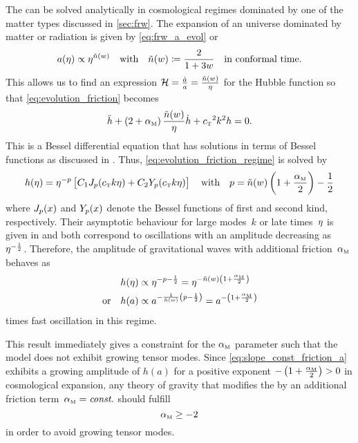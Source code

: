 \documentclass[12pt,parskip=half]{scrreprt}
\begin{document}
The  can be solved analytically in cosmological regimes dominated by one of the matter types discussed in \autoref{sec:frw}. The expansion of an \FLRW universe dominated by matter or radiation is given by \eqref{eq:frw_a_evol} or
\begin{equation}
	a(\eta) \propto \eta^{\tilde{n}(w)} \quad \text{with} \quad \tilde{n}(w) \coloneqq \frac{2}{1+3w} \quad \text{in conformal time.}
\end{equation}
This allows us to find an expression \(\mathcal{H} = \frac{\dot{a}}{a} = \frac{\tilde{n}(w)}{\eta}\) for the Hubble function so that \eqref{eq:evolution_friction} becomes
\begin{equation}\label{eq:evolution_friction_regime}
	\ddconf{h} + \del{2 + \alphaM} \frac{\nexpconft}{\conft} \dconf{h} + \cT^2 k^2 h = 0
	\eqpunct{.}
\end{equation}
This is a Bessel differential equation that has solutions in terms of Bessel functions as discussed in . Thus, \eqref{eq:evolution_friction_regime} is solved by
\begin{equation}
	h(\conft) = \conft^{-p} \sbr{C_1 \besselJ_p(\cT k \conft) + C_2 \besselY_p(\cT k \conft)} \quad \text{with} \quad p = \nexpconft\del{1 + \frac{\alphaM}{2}}-\frac{1}{2}
\end{equation}
where \(J_p(x)\) and \(Y_p(x)\) denote the Bessel functions of first and second kind, respectively. Their asymptotic behaviour for large modes~\(k\) or late times~\(\eta\) is given in  and both correspond to oscillations with an amplitude decreasing as~\(\eta^{-\frac{1}{2}}\). Therefore, the amplitude of gravitational waves with additional friction~\({\alpha_{\textnormal{\tiny{M}}}}\) behaves as
\begin{subequations}\label{eq:slope_const_friction}
\begin{align}
	h(\conft) &\propto \conft^{-p-\frac{1}{2}} = \conft^{-\nexpconft\del{1+\frac{\alphaM}{2}}} \\
	\text{or} \quad h(a) &\propto a^{-\frac{1}{\nexpconft}\del{p-\frac{1}{2}}} = a^{-\del{1+\frac{\alphaM}{2}}} \label{eq:slope_const_friction_a}
\end{align}
\end{subequations}
times fast oscillation in this regime.

This result immediately gives a constraint for the \({\alpha_{\textnormal{\tiny{M}}}}\) parameter such that the model does not exhibit growing tensor modes. Since \eqref{eq:slope_const_friction_a} exhibits a growing amplitude of \(h(a)\) for a positive exponent \(-\del{1+\frac{\alphaM}{2}} > 0\) in cosmological expansion, any theory of gravity that modifies the  by an additional friction term~\({\alpha_{\textnormal{\tiny{M}}}}=\textnormal{\textit{const.}}\) should fulfill
\begin{equation}\label{eq:grow_cond_const_fric}
	{\alpha_{\textnormal{\tiny{M}}}} \geq -2
\end{equation}
in order to avoid growing tensor modes.
\end{document}
